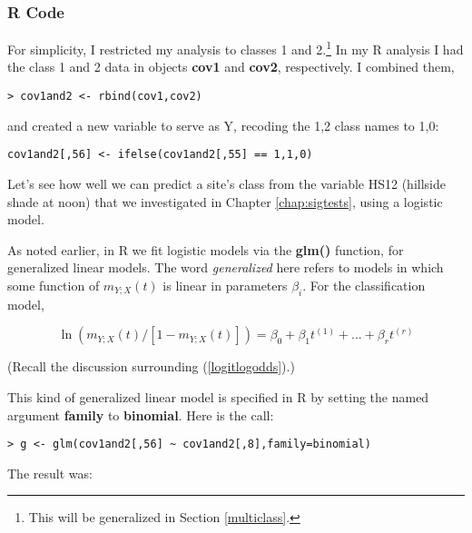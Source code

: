 \subsubsection{R Code}

For simplicity, I restricted my analysis to classes 1 and
2.\footnote{This will be generalized in Section \ref{multiclass}.}  In
my R analysis I had the class 1 and 2 data in objects {\bf cov1} and
{\bf cov2}, respectively.  I combined them,

\begin{Verbatim}[fontsize=\relsize{-2}]
> cov1and2 <- rbind(cov1,cov2)
\end{Verbatim}

and created a new variable to serve as Y, recoding the 1,2 class names
to 1,0:

\begin{Verbatim}[fontsize=\relsize{-2}]
cov1and2[,56] <- ifelse(cov1and2[,55] == 1,1,0)
\end{Verbatim}

Let's see how well we can predict a site's class from the variable HS12
(hillside shade at noon) that we investigated in Chapter
\ref{chap:sigtests}, using a logistic model.

As noted earlier, in R we fit logistic models via the {\bf glm()}
function, for generalized linear models.  The word {\it generalized}
here refers to models in which some function of $m_{Y;X}(t)$ is linear
in parameters $\beta_i$.  For the classification model, 

\begin{equation}
\ln \left (  m_{Y;X}(t) / [1-m_{Y;X}(t)] \right )
= \beta_0 + \beta_1 t^{(1)} + ... + \beta_r t^{(r)}
\end{equation}

(Recall the discussion surrounding (\ref{logitlogodds}).)

This kind of generalized linear model is specified in R by setting the
named argument {\bf family} to {\bf binomial}.  Here is the call:

\begin{Verbatim}[fontsize=\relsize{-2}]
> g <- glm(cov1and2[,56] ~ cov1and2[,8],family=binomial)
\end{Verbatim}

The result was:

